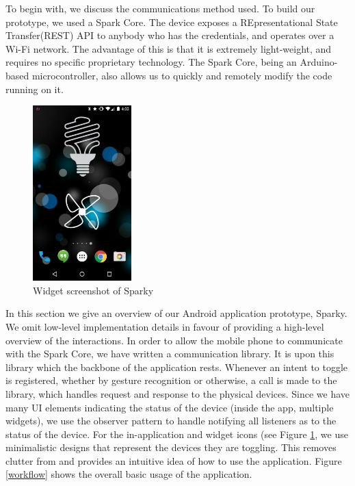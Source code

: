 \documentclass[journal]{IEEEtran}
\begin{document}
To begin with, we discuss the communications method used. To build our prototype, we used a Spark Core. The device exposes a REpresentational State Transfer(REST) API to anybody who has the credentials, and operates over a Wi-Fi network. The advantage of this is that it is extremely light-weight, and requires no specific proprietary technology. The Spark Core, being an Arduino-based microcontroller, also allows us to quickly and remotely modify the code running on it. 
\begin{figure}[!t]
\centering
\includegraphics[width=1.5in]{S3.jpg}
\caption{Widget screenshot of Sparky}
\label{widgetScreenshot}
\end{figure}


In this section we give an overview of our Android application prototype, Sparky. We omit low-level implementation details in favour of providing a high-level overview of the interactions. In order to allow the mobile phone to communicate with the Spark Core, we have written a communication library. It is upon this library which the backbone of the application rests. Whenever an intent to toggle is registered, whether by gesture recognition or otherwise, a call is made to the library, which handles request and response to the physical devices. Since we have many UI elements indicating the status of the device (inside the app, multiple widgets), we use the observer pattern to handle notifying all listeners as to the status of the device. For the in-application and widget icons (see Figure \ref{widgetScreenshot}, we use minimalistic designs that represent the devices they are toggling. This removes clutter from and provides an intuitive idea of how to use the application. Figure \ref{workflow} shows the overall basic usage of the application.
\end{document}
